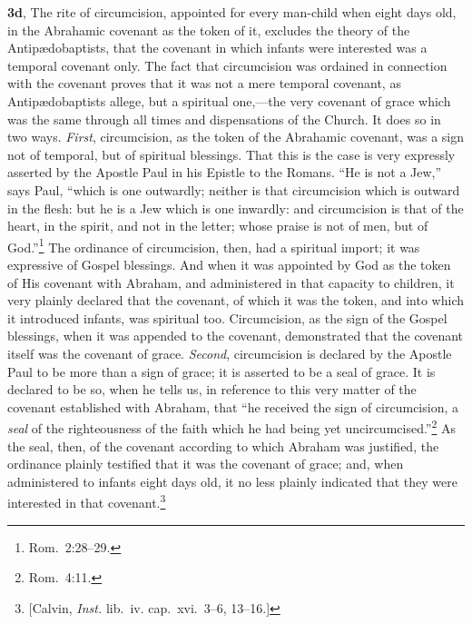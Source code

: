 \documentclass[
  english,
]{book}
\begin{document}
\textbf{3d}, The rite of circumcision, appointed for every man-child when eight days old, in the Abrahamic covenant as the token of it, excludes the theory of the Antipædobaptists, that the covenant in which infants were interested was a temporal covenant only. The fact that circumcision was ordained in connection with the covenant proves that it was not a mere temporal covenant, as Antipædobaptists allege, but a spiritual one,---the very covenant of grace which was the same through all times and dispensations of the Church. It does so in two ways. \emph{First}, circumcision, as the token of the Abrahamic covenant, was a sign not of temporal, but of spiritual blessings. That this is the case is very expressly asserted by the Apostle Paul in his Epistle to the Romans. ``He is not a Jew,'' says Paul, ``which is one outwardly; neither is that circumcision which is outward in the flesh: but he is a Jew which is one inwardly: and circumcision is that of the heart, in the spirit, and not in the letter; whose praise is not of men, but of God.''\footnote{Rom.~2:28--29.} The ordinance of circumcision, then, had a spiritual import; it was expressive of Gospel blessings. And when it was appointed by God as the token of His covenant with Abraham, and administered in that capacity to children, it very plainly declared that the covenant, of which it was the token, and into which it introduced infants, was spiritual too. Circumcision, as the sign of the Gospel blessings, when it was appended to the covenant, demonstrated that the covenant itself was the covenant of grace. \emph{Second}, circumcision is declared by the Apostle Paul to be more than a sign of grace; it is asserted to be a seal of grace. It is declared to be so, when he tells us, in reference to this very matter of the covenant established with Abraham, that ``he received the sign of circumcision, a \emph{seal} of the righteousness of the faith which he had being yet uncircumcised.''\footnote{Rom.~4:11.} As the seal, then, of the covenant according to which Abraham was justified, the ordinance plainly testified that it was the covenant of grace; and, when administered to infants eight days old, it no less plainly indicated that they were interested in that covenant.\footnote{{[}Calvin, \emph{Inst.} lib.~iv. cap.~xvi.~3--6, 13--16.{]}}
\end{document}
